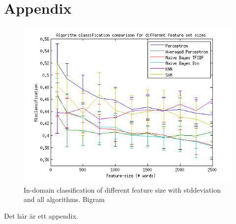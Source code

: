 \chapter{Appendix}
\begin{figure}[H]
\centering
\includegraphics[scale = 0.2]{../Plottar/feature-size100-2500bigram.png}
\caption{In-domain classification of different feature size with stddeviation and all algorithms. Bigram}
\label{fig:trainingsize}
\end{figure} 



Det här är ett appendix.
